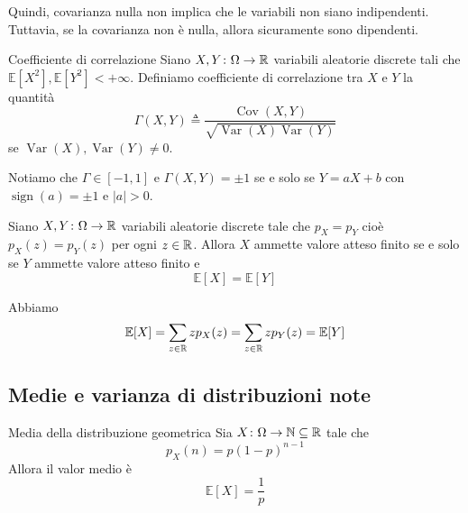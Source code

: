 \documentclass[a4paper]{article}
\begin{document}
Quindi, covarianza nulla non implica che le variabili non siano indipendenti.
Tuttavia, se la covarianza non è nulla, allora sicuramente sono dipendenti.

\begin{snippetdefinition}{Coefficiente di correlazione}
    Siano \(X,Y \colon \Omega \to \mathbb{R}\)
    variabili aleatorie discrete tali che \(\mathbb E[X^2],\mathbb E[Y^2] < +\infty\).
    Definiamo coefficiente di correlazione tra \(X\) e \(Y\) la quantità
    \[
        \Gamma(X,Y) \triangleq \frac{\operatorname{Cov}(X,Y)}{\sqrt{\operatorname{Var}(X)\operatorname{Var}(Y)}}
    \]
    se \(\operatorname{Var}(X), \operatorname{Var}(Y) \neq 0\).
\end{snippetdefinition}

Notiamo che \(\Gamma \in [-1, 1]\)
e \(\Gamma(X,Y) = \pm 1\)
se e solo se \(Y = aX + b\) con \(\operatorname{sign}(a) = \pm 1\) e \(|a|>0\).

\begin{snippetproposition}{}
    Siano \(X,Y \colon \Omega \to \mathbb{R}\) variabili aleatorie discrete tale che
    \(p_X = p_Y\) cioè \(p_X(z) = p_Y(z)\) per ogni \(z \in \mathbb{R}\).
    Allora \(X\) ammette valore atteso finito se e solo se \(Y\) ammette valore atteso finito e
    \[
        \mathbb E[X] = \mathbb E[Y]
    \]
\end{snippetproposition}

\begin{snippetproof}{}
    Abbiamo
    \begin{align*}
        \mathbb E[X] = \sum_{z \in \mathbb{R}} zp_X(z)
        = \sum_{z \in \mathbb{R}} zp_Y(z) = \mathbb E[Y]
    \end{align*}
\end{snippetproof}

\subsection{Medie e varianza di distribuzioni note}

\begin{snippetproposition}{Media della distribuzione geometrica}
    Sia \(X \colon \Omega \to \mathbb{N} \subseteq \mathbb{R}\)
    tale che \[
        p_X(n) = p(1-p)^{n-1}
    \]
    Allora il valor medio è
    \[
        \mathbb E[X] = \frac1p
    \]
\end{snippetproposition}
\end{document}
